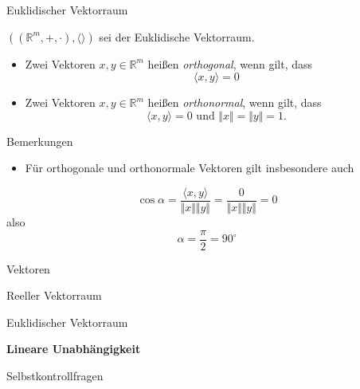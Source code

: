 \documentclass[
  8pt,
  ignorenonframetext,
]{beamer}
\providecommand{\tightlist}{%
  \setlength{\itemsep}{0pt}\setlength{\parskip}{0pt}}
\begin{document}
\begin{frame}{Euklidischer Vektorraum}
\protect\hypertarget{euklidischer-vektorraum-12}{}
\vspace{3mm}
\small
\begin{definition}
\justifying
$\left((\mathbb{R}^m, +, \cdot), \langle \rangle \right)$ sei der Euklidische Vektorraum.
\begin{itemize}
\item Zwei Vektoren $x,y \in \mathbb{R}^m$ heißen \textit{orthogonal}, wenn gilt, dass
\begin{equation}
\langle x, y \rangle = 0
\end{equation}
\item Zwei Vektoren $x,y \in \mathbb{R}^m$ heißen \textit{orthonormal}, wenn gilt, dass
\begin{equation}
\langle x, y \rangle = 0 \mbox{ und } \Vert x \Vert = \Vert y \Vert = 1.
\end{equation}
\end{itemize}
\end{definition}

Bemerkungen

\begin{itemize}
\tightlist
\item
  Für orthogonale und orthonormale Vektoren gilt insbesondere auch
\end{itemize}

\begin{equation}
\cos \alpha
= \frac{\langle x, y \rangle}{\Vert x \Vert \Vert y \Vert}
= \frac{0}{\Vert x \Vert \Vert y \Vert}
= 0
\end{equation} also \begin{equation}
\alpha = \frac{\pi}{2} = 90^{\circ}
\end{equation}
\end{frame}

\begin{frame}{Vektoren}
\protect\hypertarget{vektoren-4}{}
\vspace{3mm}
\vfill
{}
\Large

Reeller Vektorraum

Euklidischer Vektorraum

\textbf{Lineare Unabhängigkeit}

Selbstkontrollfragen
\end{frame}
\end{document}
